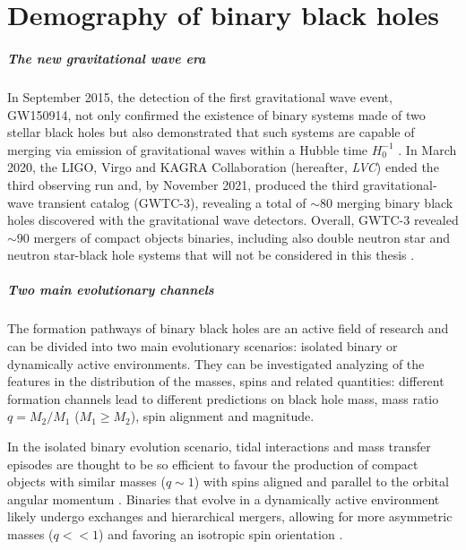 \documentclass[a4paper,titlepage]{book}     	%
\begin{document}
\chapter{Demography of binary black holes}\label{ch:GW}

\paragraph{The new gravitational wave era} In September 2015, the detection of the first gravitational wave event, GW150914, not only confirmed the existence of binary systems made of two stellar black holes but also demonstrated that such systems are capable of merging via emission of gravitational waves within a Hubble time $H_0^{-1}$ \cite{Abbott2016firstGW}. In March 2020, the LIGO, Virgo and KAGRA Collaboration (hereafter, \emph{LVC}) ended the third observing run and, by November 2021, produced the third gravitational-wave transient catalog (GWTC-3), revealing a total of $\sim 80$ merging binary black holes discovered with the gravitational wave detectors. Overall, GWTC-3 revealed $\sim 90$ mergers of compact objects binaries, including also double neutron star and neutron star-black hole systems that will not be considered in this thesis \cite{GWTC-3}. 


\paragraph{Two main evolutionary channels}
The formation pathways of binary black holes are an active field of research and can be divided into two main evolutionary scenarios: isolated binary or dynamically active environments. They can be investigated analyzing of the features in the distribution of the masses, spins and related quantities: different formation channels lead to different predictions on black hole mass, mass ratio $q=M_2/M_1$ ($M_1 \geq M_2$), spin alignment and magnitude.
 
In the isolated binary evolution scenario, tidal interactions and mass transfer episodes are thought to be so efficient to favour the production of compact objects with similar masses ($q \sim 1$) \cite{giacobbomapelli2018_mobse_fryer} with spins aligned and parallel to the orbital angular momentum \cite{Kalogera2000_spinaligned}. Binaries that evolve in a dynamically active environment likely undergo exchanges and hierarchical mergers, allowing for more asymmetric masses ($q << 1$) \cite{Rastello2021_dynamics} and favoring an isotropic spin orientation \cite{Rodriguez2016_BHspins}.
\end{document}

